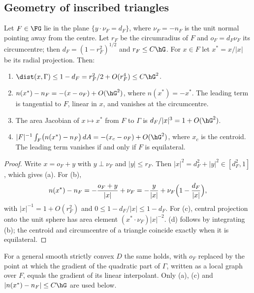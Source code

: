 \subsection{Geometry of inscribed triangles}

\begin{lemma}[Faces]\label{td:faces}
Let $F\in\FG$ lie in the plane $\{y\cdot\nu_F=d_F\}$, where $\nu_F=-n_F$ is the unit normal pointing away from the centre. Let $r_F$ be the circumradius of $F$ and $o_F=d_F\nu_F$ its circumcentre; then $d_F=(1-r_F^2)^{1/2}$ and $r_F\le C\hG$. For $x\in F$ let $x^\ast=x/|x|$ be its radial projection. Then:
\begin{enumerate}[label=(\alph*)]
\item $\dist(x,\Gamma)\le1-d_F=r_F^2/2+O(r_F^4)\le C\hG^2$.
\item $n(x^\ast)-n_F=-(x-o_F)+O(\hG^2)$, where $n(x^\ast)=-x^\ast$. The leading term is tangential to $F$, linear in $x$, and vanishes at the circumcentre.
\item The area Jacobian of $x\mapsto x^\ast$ from $F$ to $\Gamma$ is $d_F/|x|^3=1+O(\hG^2)$.
\item $|F|^{-1}\int_F\bigl(n(x^\ast)-n_F\bigr)\,dA=-(x_c-o_F)+O(\hG^2)$, where $x_c$ is the centroid. The leading term vanishes if and only if $F$ is equilateral.
\end{enumerate}
\end{lemma}

\begin{proof}
Write $x=o_F+y$ with $y\perp\nu_F$ and $|y|\le r_F$. Then $|x|^2=d_F^2+|y|^2\in[d_F^2,1]$, which gives (a). For (b),
\[
n(x^\ast)-n_F=-\frac{o_F+y}{|x|}+\nu_F=-\frac{y}{|x|}+\nu_F\Bigl(1-\frac{d_F}{|x|}\Bigr),
\]
with $|x|^{-1}=1+O(r_F^2)$ and $0\le1-d_F/|x|\le1-d_F$. For (c), central projection onto the unit sphere has area element $(x^\ast\cdot\nu_F)|x|^{-2}$. (d) follows by integrating (b); the centroid and circumcentre of a triangle coincide exactly when it is equilateral.
\end{proof}
\par{}

For a general smooth strictly convex $D$ the same holds, with $o_F$ replaced by the point at which the gradient of the quadratic part of $\Gamma$, written as a local graph over $F$, equals the gradient of its linear interpolant. Only (a), (c) and $|n(x^\ast)-n_F|\le C\hG$ are used below.

